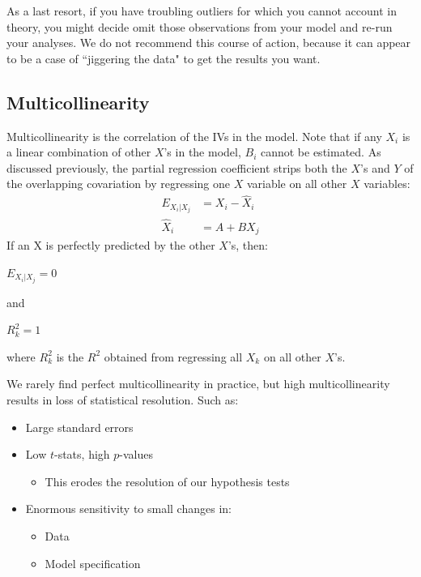 \documentclass[11pt,openany]{book}\usepackage[]{graphicx}\usepackage[]{color}
\begin{document}
{As a last resort, if you have troubling outliers for which you cannot account in theory, you might decide omit those observations from your model and re-run your analyses. We do not recommend this course of action, because it can  appear to be a case of ``jiggering the data" to get the results you want. 

\subsection{Multicollinearity} 

Multicollinearity is the correlation of the IVs in the model. Note that if any $X_i$ is a linear combination of other $X$'s in the model, $B_i$ cannot be estimated. As discussed previously, the partial regression coefficient strips both the $X$'s and $Y$ of the overlapping covariation by regressing one $X$ variable on all other $X$ variables: 
\begin{align*}
  E_{X_{i}|X_{j}} &= X_i - \hat{X}_i \\
  \hat{X}_i &= A + BX_j 
\end{align*}
If an X is perfectly predicted by the other $X$'s, then:
\begin{center}
  $E_{X_{i}|X_{j}}=0$ 
  
  and 
  
  $R^2_k=1$
\end{center}
\noindent where $R^2_k$ is the $R^2$ obtained from regressing all
$X_k$ on all other $X$'s. 

We rarely find perfect multicollinearity in practice, but high multicollinearity results in loss of statistical resolution. Such as:  
\begin{itemize}
\item Large standard errors
\item Low $t$-stats, high $p$-values
  \begin{itemize}
\item This erodes the resolution of our hypothesis tests
  \end{itemize}
\item Enormous sensitivity to small changes in:
  \begin{itemize}
\item Data
\item Model specification
  \end{itemize}
  \end{itemize}

}
\end{document}
